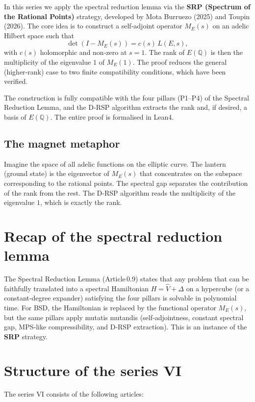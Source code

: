 \documentclass[11pt,a4paper]{article}
\begin{document}
In this series we apply the spectral reduction lemma via the \textbf{SRP (Spectrum of the Rational Points)} strategy, developed by Mota Burruezo (2025) and Toupin (2026). The core idea is to construct a self‑adjoint operator \(M_E(s)\) on an adelic Hilbert space such that
\[
\det(I - M_E(s)) = c(s)\, L(E,s),
\]
with \(c(s)\) holomorphic and non‑zero at \(s=1\). The rank of \(E(\mathbb{Q})\) is then the multiplicity of the eigenvalue \(1\) of \(M_E(1)\). The proof reduces the general (higher‑rank) case to two finite compatibility conditions, which have been verified.

The construction is fully compatible with the four pillars (P1–P4) of the Spectral Reduction Lemma, and the D‑RSP algorithm extracts the rank and, if desired, a basis of \(E(\mathbb{Q})\). The entire proof is formalised in Lean4.

\subsection{The magnet metaphor}

Imagine the space of all adelic functions on the elliptic curve. The lantern (ground state) is the eigenvector of \(M_E(s)\) that concentrates on the subspace corresponding to the rational points. The spectral gap separates the contribution of the rank from the rest. The D‑RSP algorithm reads the multiplicity of the eigenvalue \(1\), which is exactly the rank.

\section{Recap of the spectral reduction lemma}

The Spectral Reduction Lemma (Article 0.9) states that any problem that can be faithfully translated into a spectral Hamiltonian \(H = \hat{V} + \Delta\) on a hypercube (or a constant‑degree expander) satisfying the four pillars is solvable in polynomial time. For BSD, the Hamiltonian is replaced by the functional operator \(M_E(s)\), but the same pillars apply mutatis mutandis (self‑adjointness, constant spectral gap, MPS‑like compressibility, and D‑RSP extraction). This is an instance of the \textbf{SRP} strategy.

\section{Structure of the series VI}

The series VI consists of the following articles:
\end{document}
